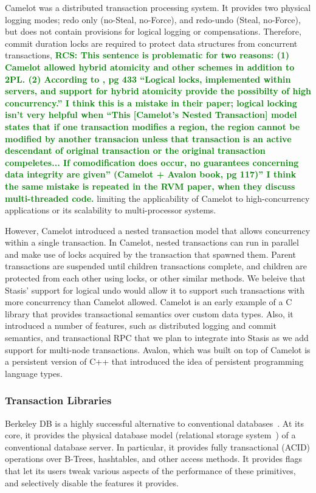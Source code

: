 \documentclass[letterpaper,twocolumn,10pt]{article}
\newcommand{\yad}{Stasis\xspace}
\newcommand{\yads}{Stasis'\xspace}
\newcommand{\rcs}[1]{\textcolor{green}{\bf RCS: #1}}
\begin{document}
Camelot was a distributed transaction processing system.  It provides
two physical logging modes; redo only (no-Steal, no-Force), and
redo-undo (Steal, no-Force), but does not contain provisions for
logical logging or compensations.  Therefore, commit duration locks
are required to protect data structures from concurrent
transactions, 
\rcs{This sentence is problematic for two reasons: (1)
Camelot allowed hybrid atomicity and other schemes in addition to 2PL.
(2) According to \cite{camelot}, pg 433 ``Logical locks, implemented
within servers, and support for hybrid atomicity provide the
possibilty of high concurrency.''  I think this is a mistake in their
paper; logical locking isn't very helpful when ``This [Camelot's
Nested Transaction] model states that if one transaction modifies a
region, the region cannot be modified by another transacion unless
that transaction is an active descendant of original transaction or
the original transaction compeletes... If comodification does occur,
no guarantees concerning data integrity are given'' (Camelot + Avalon
book, pg 117)'' I think the same mistake is repeated in the RVM
paper, when they discuss multi-threaded code.} 
limiting the applicability of Camelot to high-concurrency applications
or its scalability to multi-processor systems.

However, Camelot introduced a nested transaction model that allows
concurrency within a single transaction.  In Camelot, nested
transactions can run in parallel and make use of locks acquired by the
transaction that spawned them.  Parent transactions are suspended
until children transactions complete, and children are protected from
each other using locks, or other similar methods.  We beleive that
\yads support for logical undo would allow it to support such
transactions with more concurrency than Camelot allowed.  Camelot is
an early example of a C library that provides transactional semantics
over custom data types.  Also, it introduced a number of features,
such as distributed logging and commit semantics, and transactional
RPC that we plan to integrate into \yad as we add support for
multi-node transactions.  Avalon, which was built on top of Camelot is
a persistent version of C++ that introduced the idea of persistent
programming language types.

\subsubsection{Transaction Libraries}

Berkeley DB is a highly successful alternative to conventional
databases~\cite{libtp}.  At its core, it provides the physical database model
(relational storage system~\cite{systemR}) of a conventional database server.
In particular, 
it provides fully transactional (ACID) operations over B-Trees, 
hashtables, and other access methods.  It provides flags that 
let its users tweak various aspects of the performance of these
primitives, and selectively disable the features it provides.
\end{document}
